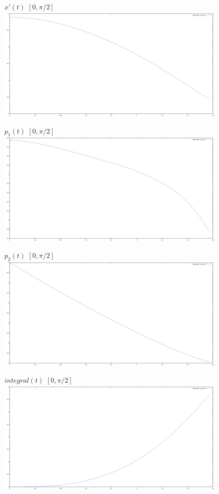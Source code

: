 \documentclass[titlepage]{article}
\begin{document}
\newpage
\begin{figure}[h!]
$x'(t)$ $[0, \pi/2]$\\
\centering
\includegraphics[width=1\linewidth]{x_21(t).png} 
\end{figure}
\begin{figure}[h!]
$p_1(t)$ $[0, \pi/2]$\\
\centering
\includegraphics[width=1\linewidth]{p_11(t).png} 
\end{figure}
\begin{figure}[h!]
$p_2(t)$ $[0, \pi/2]$\\
\centering
\includegraphics[width=1\linewidth]{p_21(t).png} 
\end{figure}
\begin{figure}[h!]
$integral(t)$ $[0, \pi/2]$ \\
\centering
\includegraphics[width=1\linewidth]{integral1(t).png} 
\end{figure}
\end{document}
